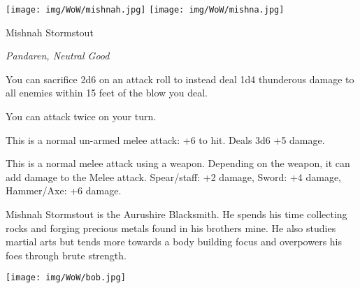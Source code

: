 \begin{center}
	\texttt{[image: img/WoW/mishnah.jpg]} 		\texttt{[image: img/WoW/mishna.jpg]}
\end{center}

\begin{monsterbox}{Mishnah Stormstout}
	\begin{hangingpar}
		\textit{Pandaren, Neutral Good}
	\end{hangingpar}
	\dndline%
	\basics[%
	armorclass = 17,
	hitpoints  = 172,
	speed      = 30 ft
	]
	\dndline%
	\stats[
	STR = \stat{20}, %
	DEX = \stat{18},
	CON = \stat{18},
	INT = \stat{12},
	WIS = \stat{16},
	CHA = \stat{18}
	]
	\dndline%
	\details[%
	languages = {Common, Elvish, Dwarvish, Gnomish, Halfling, Orc, Pandaren},
	challenge = 10
	]
	\dndline%
	\begin{monsteraction}
		You can sacrifice 2d6 on an attack roll to instead deal 1d4 thunderous damage to all enemies within 15 feet of the blow you deal.
	\end{monsteraction}	
	\begin{monsteraction}
		You can attack twice on your turn.
	\end{monsteraction}
	\begin{monsteraction}[Melee]
		This is a normal un-armed melee attack: +6 to hit. Deals 3d6 +5 damage.
	\end{monsteraction}
	\begin{monsteraction}
		This is a normal melee attack using a weapon. Depending on the weapon, it can add damage to the Melee attack. Spear/staff: +2 damage, Sword: +4 damage, Hammer/Axe: +6 damage.
	\end{monsteraction}
	Mishnah Stormstout is the Aurushire Blacksmith. He spends his time collecting rocks and forging precious metals found in his brothers mine. He also studies martial arts but tends more towards a body building focus and overpowers his foes through brute strength.
\end{monsterbox}

\begin{center}
	\texttt{[image: img/WoW/bob.jpg]}
\end{center}

